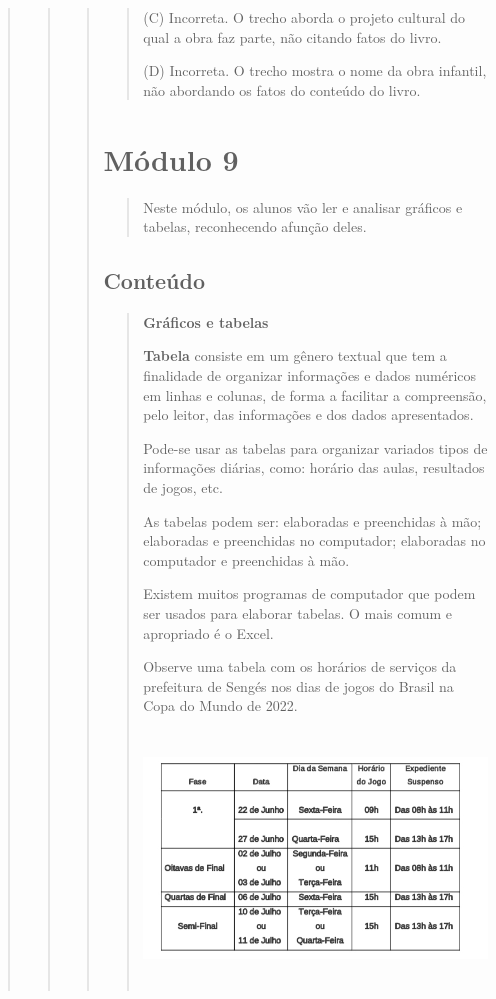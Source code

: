 \begin{quote}
\begin{quote}
\begin{quote}
\begin{quote}
(C) Incorreta. O trecho aborda o projeto cultural do qual a obra faz
parte, não citando fatos do livro.

(D) Incorreta. O trecho mostra o nome da obra infantil, não abordando os
fatos do conteúdo do livro.
\end{quote}

\section{Módulo 9}\label{muxf3dulo-9}

\begin{quote}
Neste módulo, os alunos vão ler e analisar gráficos e tabelas,
reconhecendo afunção deles.
\end{quote}

\subsection{Conteúdo}\label{conteuxfado-8}

\begin{quote}
\textbf{Gráficos e tabelas}

\textbf{Tabela} consiste em um gênero textual que tem a finalidade de
organizar informações e dados numéricos em linhas e colunas, de forma a
facilitar a compreensão, pelo leitor, das informações e dos dados
apresentados.

Pode-se usar as tabelas para organizar variados tipos de informações
diárias, como: horário das aulas, resultados de jogos, etc.

As tabelas podem ser: elaboradas e preenchidas à mão; elaboradas e
preenchidas no computador; elaboradas no computador e preenchidas à mão.

Existem muitos programas de computador que podem ser usados para
elaborar tabelas. O mais comum e apropriado é o Excel.

Observe uma tabela com os horários de serviços da prefeitura de Sengés
nos dias de jogos do Brasil na Copa do Mundo de 2022.

\includegraphics[width=4.56744in,height=2.66667in]{media/image28.png}


\end{quote}
\end{quote}
\end{quote}
\end{quote}

